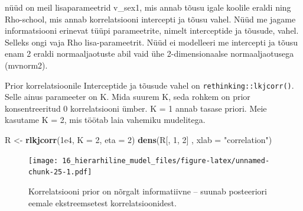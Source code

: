 \documentclass[]{book}
\newenvironment{Shaded}{\begin{snugshade}}{\end{snugshade}}
\newcommand{\DataTypeTok}[1]{\textcolor[rgb]{0.13,0.29,0.53}{#1}}
\newcommand{\DecValTok}[1]{\textcolor[rgb]{0.00,0.00,0.81}{#1}}
\newcommand{\FloatTok}[1]{\textcolor[rgb]{0.00,0.00,0.81}{#1}}
\newcommand{\KeywordTok}[1]{\textcolor[rgb]{0.13,0.29,0.53}{\textbf{#1}}}
\newcommand{\NormalTok}[1]{#1}
\newcommand{\StringTok}[1]{\textcolor[rgb]{0.31,0.60,0.02}{#1}}
\begin{document}
nüüd on meil lisaparameetrid v\_sex1, mis annab tõusu igale koolile eraldi ning Rho-school, mis annab korrelatsiooni intercepti ja tõusu vahel. Nüüd me jagame informatsiooni erinevat tüüpi parameetrite, nimelt interceptide ja tõusude, vahel. Selleks ongi vaja Rho lisa-parameetrit. Nüüd ei modelleeri me intercepti ja tõusu enam 2 eraldi normaaljaotuste abil vaid ühe 2-dimensionaalse normaaljaotusega (mvnorm2).

Prior korrelatsioonile Interceptide ja tõusude vahel on \texttt{rethinking::lkjcorr()}.
Selle ainus parameeter on K.
Mida suurem K, seda rohkem on prior konsentreeritud 0 korrelatsiooni ümber. K = 1 annab tasase priori.
Meie kasutame K = 2, mis töötab laia vahemiku mudelitega.

\begin{Shaded}
\begin{Highlighting}[]
\NormalTok{R <-}\StringTok{ }\KeywordTok{rlkjcorr}\NormalTok{(}\FloatTok{1e4}\NormalTok{, }\DataTypeTok{K =} \DecValTok{2}\NormalTok{, }\DataTypeTok{eta =} \DecValTok{2}\NormalTok{)}
\KeywordTok{dens}\NormalTok{(R[, }\DecValTok{1}\NormalTok{, }\DecValTok{2}\NormalTok{] , }\DataTypeTok{xlab =} \StringTok{"correlation"}\NormalTok{)}
\end{Highlighting}
\end{Shaded}

\begin{figure}
\centering
\texttt{[image: 16\_hierarhiline\_mudel\_files/figure-latex/unnamed-chunk-25-1.pdf]}
\caption{\label{fig:unnamed-chunk-25}Korrelatsiooni prior on nõrgalt informatiivne -- suunab posteeriori eemale ekstreemsetest korrelatsioonidest.}
\end{figure}
\end{document}
